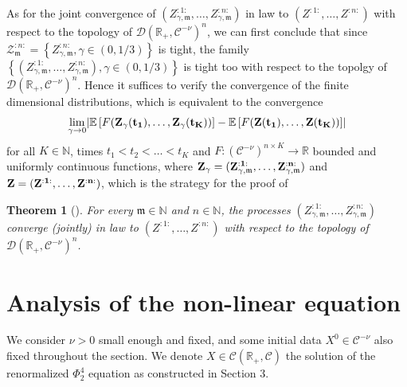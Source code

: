 \documentclass{report}
\newcommand{\NN}{\mathbb{N}}
\newcommand{\RR}{\mathbb{R}}
\DeclarePairedDelimiter\abs{\lvert}{\rvert} %
\newcommand{\Exp}[1]{\mathbb{E}\left[#1\right]}
\newtheorem{theorem}{Theorem}[chapter]
\theoremstyle{remark}
\theoremstyle{definition}
\begin{document}
As for the joint convergence of $(Z_{\gamma, \mathfrak{m}}^{:1:}, \ldots, Z_{\gamma, \mathfrak{m}}^{:n:})$ in law to $(Z^{:1:}, \ldots, Z^{:n:})$ with respect to the topology of $\mathcal{D}(\mathbb{R}_+, \mathcal{C}^{-\nu})^n$, we can first conclude that since $\mathcal{Z}^{:n:}_\mathfrak{m} = \left\{Z_{\gamma, \mathfrak{m}}^{:n:}, \gamma \in (0, 1/3)\right\}$ is tight, the family $\left\{(Z_{\gamma, \mathfrak{m}}^{:1:}, \ldots, Z_{\gamma, \mathfrak{m}}^{:n:}), \gamma \in (0, 1/3)\right\}$ is tight too with respect to the topolgy of $\mathcal{D}(\mathbb{R}_+, \mathcal{C}^{-\nu})^n$. Hence it suffices to verify the convergence of the finite dimensional distributions, which is equivalent to the convergence 
\begin{align*}
  \lim_{\gamma \to 0}\abs{\Exp{F(\bf{Z_\gamma(t_1), \ldots, Z_\gamma(t_K)})} - \Exp{F(\bf{Z(t_1), \ldots, Z(t_K)})}}
\end{align*}
for all $K \in \NN$, times $t_1 < t_2 < \ldots < t_K$ and $F: (\mathcal{C}^{-\nu})^{n \times K} \to \mathbb{R}$ bounded and uniformly continuous functions, where $\bf{Z}_\gamma = (Z^{:1:}_{\gamma, \mathfrak{m}}, \ldots, Z^{:n:}_{\gamma, \mathfrak{m}} )$ and $\bf{Z} = (Z^{:1:}, \ldots, Z^{:n:} )$, which is the strategy for the proof of 
\begin{theorem}[{\cite[Theorem 6.2]{mourrat2015convergencetwodimensionaldynamicisingkac}}]
  For every $\mathfrak{m} \in \NN$ and $n \in \NN$, the processes $(Z^{:1:}_{\gamma, \mathfrak{m}}, \ldots, Z^{:n:}_{\gamma, \mathfrak{m}} )$ converge (jointly) in law to $(Z^{:1:}, \ldots, Z^{:n:} )$ with respect to the topology of $\mathcal{D}(\RR_+, \mathcal{C}^{-\nu})^n$.
\end{theorem}

\chapter{Analysis of the non-linear equation}
We consider $\nu > 0$ small enough and fixed, and some initial data $X^0 \in \mathcal{C}^{-\nu}$ also fixed throughout the section. We denote $X \in \mathcal{C}(\mathbb{R}_+, \mathcal{C})$ the solution of the renormalized $\Phi^4_2$ equation as constructed in Section 3.
\end{document}
